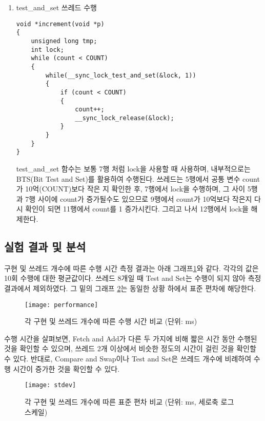 \documentclass[11pt, a4paper]{article}
\begin{document}
\begin{enumerate}
\item test\_and\_set 쓰레드 수행
\begin{lstlisting}
void *increment(void *p)
{
	unsigned long tmp;
	int lock;
	while (count < COUNT)
	{
		while(__sync_lock_test_and_set(&lock, 1))
		{
			if (count < COUNT)
			{
				count++;
				__sync_lock_release(&lock);
			}
		}
	}
}
\end{lstlisting}

test\_and\_set 함수는 보통 7행 처럼 lock을 사용할 때 사용하며, 내부적으로는 BTS(Bit Test and Set)를 활용하여 수행된다. 쓰레드는 5행에서 공통 변수 count가 10억(COUNT)보다 작은 지 확인한 후, 7행에서 lock을 수행하며, 그 사이 5행과 7행 사이에 count가 증가될수도 있으므로 9행에서 count가 10억보다 작은지 다시 확인이 되면 11행에서 count를 1 증가시킨다. 그리고 나서 12행에서 lock을 해제한다.

\end{enumerate}

\subsection{실험 결과 및 분석}

구현 및 쓰레드 개수에 따른 수행 시간 측정 결과는 아래 그래프\ref{fig:per}와 같다. 각각의 값은 10회 수행에 대한 평균값이다. 쓰레드 8개일 때 Test and Set는 수행이 되지 않아 측정 결과에서 제외하였다. 그 밑의 그래프 \ref{fig:std}는 동일한 상황 하에서 표준 편차에 해당한다.

\begin{figure}[htbp]
	\begin{center}
		\texttt{[image: performance]}
		\caption{각 구현 및 쓰레드 개수에 따른 수행 시간 비교 (단위: ms)}\label{fig:per}
	\end{center}
\end{figure}

수행 시간을 살펴보면, Fetch and Add가 다른 두 가지에 비해 짧은 시간 동안 수행된 것을 확인할 수 있으며, 쓰레드 2개 이상에서 비슷한 정도의 시간이 걸린 것을 확인할 수 있다. 반대로, Compare and Swap이나 Test and Set은 쓰레드 개수에 비례하여 수행 시간이 증가한 것을 확인할 수 있다.

\begin{figure}[htbp]
	\begin{center}
		\texttt{[image: stdev]}
		\caption{각 구현 및 쓰레드 개수에 따른 표준 편차 비교 (단위: ms, 세로축 로그 스케일)}\label{fig:std}
	\end{center}
\end{figure}
\end{document}
